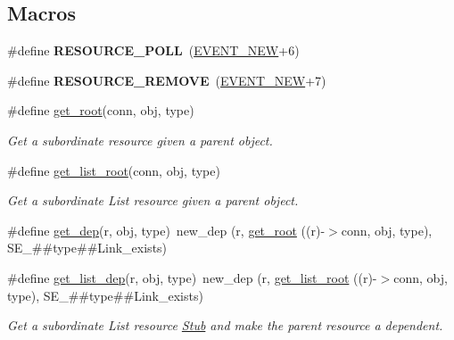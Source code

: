 \subsection*{Macros}
\begin{DoxyCompactItemize}
\item 
\mbox{\label{group__retrieve_ga509ffa3cc1f8769507050a47cc7c592c}} 
\#define {\bfseries R\+E\+S\+O\+U\+R\+C\+E\+\_\+\+P\+O\+LL}~(\hyperlink{group__event_gga2628ea8d12e8b2563c32f05dc7fff6faa747b63b45296ad40109256f1a3c93bb7}{E\+V\+E\+N\+T\+\_\+\+N\+EW}+6)
\item 
\mbox{\label{group__retrieve_ga683225f11cfab927d9715cd71af0b927}} 
\#define {\bfseries R\+E\+S\+O\+U\+R\+C\+E\+\_\+\+R\+E\+M\+O\+VE}~(\hyperlink{group__event_gga2628ea8d12e8b2563c32f05dc7fff6faa747b63b45296ad40109256f1a3c93bb7}{E\+V\+E\+N\+T\+\_\+\+N\+EW}+7)
\item 
\#define \hyperlink{group__retrieve_gae0aa47da379792fa9140b33c15717432}{get\+\_\+root}(conn,  obj,  type)
\begin{DoxyCompactList}\small\item\em Get a subordinate resource given a parent object. \end{DoxyCompactList}\item 
\#define \hyperlink{group__retrieve_ga697aeee2ace4e231973511356419305b}{get\+\_\+list\+\_\+root}(conn,  obj,  type)
\begin{DoxyCompactList}\small\item\em Get a subordinate List resource given a parent object. \end{DoxyCompactList}\item 
\#define \hyperlink{group__retrieve_gad89a532bdbbf6035ee756dc3deaa0d8f}{get\+\_\+dep}(r,  obj,  type)~new\+\_\+dep (r, \hyperlink{group__retrieve_gae0aa47da379792fa9140b33c15717432}{get\+\_\+root} ((r)-\/$>$conn, obj, type), S\+E\+\_\+\#\#type\#\#Link\+\_\+exists)
\item 
\#define \hyperlink{group__retrieve_ga504d67179b0a93f66842e322429ade11}{get\+\_\+list\+\_\+dep}(r,  obj,  type)~new\+\_\+dep (r, \hyperlink{group__retrieve_ga697aeee2ace4e231973511356419305b}{get\+\_\+list\+\_\+root} ((r)-\/$>$conn, obj, type), S\+E\+\_\+\#\#type\#\#Link\+\_\+exists)
\begin{DoxyCompactList}\small\item\em Get a subordinate List resource \hyperlink{structStub}{Stub} and make the parent resource a dependent. \end{DoxyCompactList}\end{DoxyCompactItemize}

